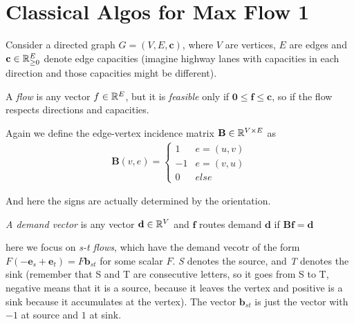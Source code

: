 

\section{Classical Algos for Max Flow 1}



\begin{definicija}
    Consider a directed graph $G = (V,E,\mathbf{c})$, where $V$ are vertices, $E$ are edges and $\mathbf{c} \in \mathbb{R}_{\geq0} ^E$ denote edge capacities (imagine highway lanes with capacities in each direction and those capacities might be different).

    A \emph{flow} is any vector $f\in \mathbb{R} ^E$, but it is \emph{feasible} only if $\mathbf{0 \leq f \leq c}$, so if the flow respects directions and capacities.

    Again we define the edge-vertex incidence matrix $\mathbf{B} \in \mathbb{R} ^{V \times E}$ as 
    \begin{align*}
        \mathbf{B}(v, e) = \begin{cases} 
            1 & e = (u,v) \\
            -1 & e = (v, u)\\
            0 & else
        \end{cases}
    \end{align*}

    And here the signs are actually determined by the orientation.

    \emph{A demand vector} is any vector $\mathbf{d} \in \mathbb{R} ^V$ and $\mathbf{f}$ routes demand $\mathbf{d}$ if $\mathbf{Bf} = \mathbf{d}$

    here we focus on \emph{s-t flows}, which have the demand vecotr of the form $F(-\mathbf{e}_s + \mathbf{e}_t) =F \mathbf{b}_{st}$ for some scalar $F$. \textit{S} denotes the source, and \textit{T} denotes the sink (remember that S and T are consecutive letters, so it goes from S to T, negative means that it is a source, because it leaves the vertex and positive is a sink because it accumulates at the vertex). The vector $\mathbf{b}_{st}$ is just the vector with $-1$ at source and $1$ at sink.
\end{definicija}


